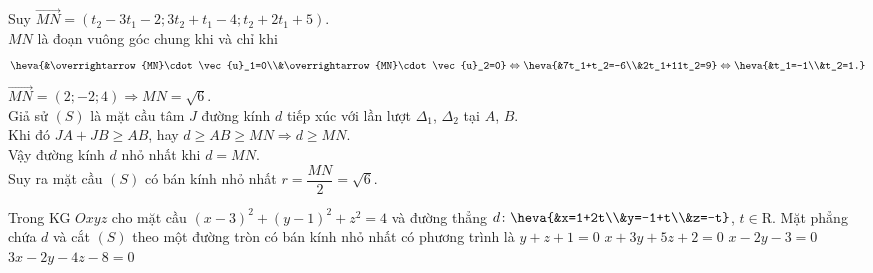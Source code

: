 \begin{ex}
{		Suy $\overrightarrow{MN}=\left(t_2-3t_1-2;3t_2+t_1-4;t_2+2t_1+5\right)$.\\
		$MN$ là đoạn vuông góc chung khi và chỉ khi \\
		$$\heva{&\overrightarrow{MN}\cdot \vec{u}_1=0\\&\overrightarrow{MN}\cdot \vec{u}_2=0} \Leftrightarrow\heva{&7t_1+t_2=-6\\&2t_1+11t_2=9} \Leftrightarrow\heva{&t_1=-1\\&t_2=1.}$$
		$\overrightarrow{MN}=(2;-2;4) \Rightarrow MN=\sqrt{6}$.\\
		Giả sử $(S)$ là mặt cầu tâm $J$ đường kính $d$ tiếp xúc với lần lượt $\Delta_1$, $\Delta_2$ tại $A$, $B$.\\ Khi đó $JA+JB\ge AB$, hay $d\ge AB \ge MN \Rightarrow d\ge MN$.\\ Vậy đường kính $d$ nhỏ nhất khi $d=MN$.\\
		Suy ra mặt cầu $(S)$ có bán kính nhỏ nhất $r=\dfrac{MN}{2}=\sqrt{6}$.
	} 
\end{ex} 
\begin{ex}%
	Trong KG $Oxyz$ cho mặt cầu $(x-3)^{2}+(y-1)^{2}+z^{2}=4$ và đường thẳng $d\colon\heva{&x=1+2t\\&y=-1+t\\&z=-t}$, $t\in \mathrm{R}$. Mặt phẳng chứa  $d$  và cắt $(S)$ theo một đường tròn có bán kính nhỏ nhất có phương trình là
	\choice
	{\True $y+z+1=0$}
	{$x+3y+5z+2=0$}
	{$x-2y-3=0$}
	{$3x-2y-4z-8=0$}
\end{ex} 
